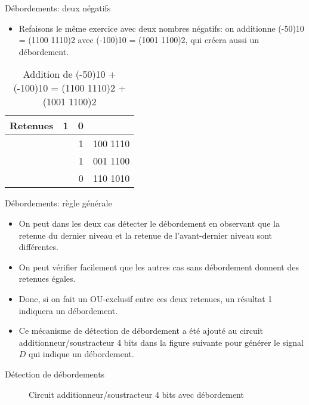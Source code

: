 \documentclass[presentation]{beamer}
\begin{document}
\begin{frame}[label={sec:orgfd85227}]{Débordements: deux négatifs}
\begin{itemize}
\item Refaisons le même exercice avec deux nombres négatifs: on additionne (-50)10 = (1100 1110)2 avec (-100)10 = (1001 1100)2, qui créera aussi un débordement.
\end{itemize}

\begin{table}[htbp]
\caption{\label{tab:orgc78d578}Addition de (-50)10 + (-100)10 = (1100 1110)2 + (1001 1100)2}
\centering
\begin{tabular}{lrrl}
Retenues & 1 & 0 & \\[0pt]
\hline
 &  & 1 & 100 1110\\[0pt]
 &  & 1 & 001 1100\\[0pt]
\hline
 &  & 0 & 110 1010\\[0pt]
\end{tabular}
\end{table}
\end{frame}

\begin{frame}[label={sec:org0405f41}]{Débordements: règle générale}
\begin{itemize}
\item On peut dans les deux cas détecter le débordement en observant que la retenue du dernier niveau et la retenue de l'avant-dernier niveau sont différentes.

\item On peut vérifier facilement que les autres cas sans débordement donnent des retenues égales.

\item Donc, si on fait un OU-exclusif entre ces deux retenues, un résultat 1 indiquera un débordement.

\item Ce mécanisme de détection de débordement a été ajouté au circuit additionneur/soustracteur 4 bits dans la figure suivante pour générer le signal \(D\) qui indique un débordement.
\end{itemize}
\end{frame}

\begin{frame}[label={sec:org8f19296}]{Détection de débordements}
\begin{figure}[htbp]
\centering

\caption{\label{fig:orgcdcb696}Circuit additionneur/soustracteur 4 bits avec débordement}
\end{figure}
\end{frame}
\end{document}
